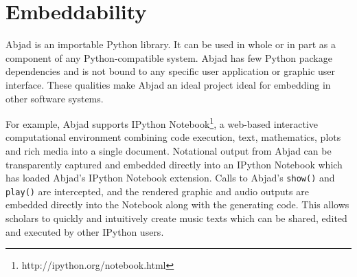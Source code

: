 \section{Embeddability}\label{sec:embeddability}

Abjad is an importable Python library. It can be used in whole or in part as a
component of any Python-compatible system. Abjad has few Python package
dependencies and is not bound to any specific user application or graphic user
interface. These qualities make Abjad an ideal project ideal for embedding in
other software systems.

For example, Abjad supports IPython
Notebook\footnote{http://ipython.org/notebook.html}, a web-based interactive
computational environment combining code execution, text, mathematics, plots
and rich media into a single document. Notational output from Abjad can
be transparently captured and embedded directly into an IPython Notebook which
has loaded Abjad's IPython Notebook extension. Calls to Abjad's \texttt{show()}
and \texttt{play()} are intercepted, and the rendered graphic and audio outputs
are embedded directly into the Notebook along with the generating code. This
allows scholars to quickly and intuitively create music texts which can be
shared, edited and executed by other IPython users.